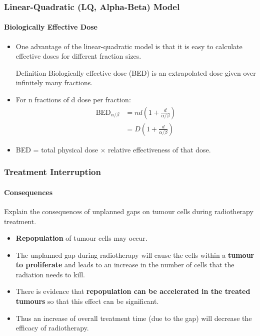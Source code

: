 \documentclass{beamer}
\begin{document}
\begin{frame}
  \frametitle{Linear-Quadratic (LQ, Alpha-Beta) Model}
  \framesubtitle{Biologically Effective Dose}
  \begin{itemize}
    \item One advantage of the linear-quadratic model is that it is easy to calculate effective doses for different fraction sizes.
    \begin{block}{Definition}
      Biologically effective dose (BED) is an extrapolated dose given over infinitely many fractions.
    \end{block}
    \item For n fractions of d dose per fraction:
    \begin{align*}
      \text{BED}_{\alpha/\beta} &= nd\left(1 + \frac{d}{\alpha/\beta}\right) \\
      &= D\left(1 + \frac{d}{\alpha/\beta}\right)
    \end{align*}
    \item BED = total physical dose $\times$ relative effectiveness of that dose.
  \end{itemize}
\end{frame}

\begin{frame}
  \frametitle{Treatment Interruption}
  \framesubtitle{Consequences}

  \begin{block}{Explain the consequences of unplanned gaps on tumour  cells during radiotherapy treatment.}
    \begin{itemize}
      \item \textbf{Repopulation} of tumour cells may occur.
      \item The unplanned gap  during radiotherapy will cause the cells within a \textbf{tumour to proliferate} and leads to an increase in the number of cells that the radiation needs to kill.
      \item There is evidence that \textbf{repopulation can be accelerated in the treated tumours} so that this effect can be significant.
      \item Thus an increase of overall treatment time (due to the gap) will decrease the efficacy of radiotherapy.
    \end{itemize}
   
  \end{block}
\end{frame}
\end{document}
